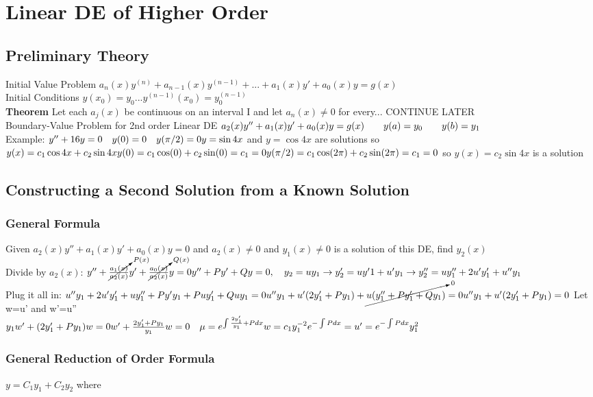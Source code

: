 \documentclass{article}
\begin{document}
\section{Linear DE of Higher Order}
\subsection{Preliminary Theory}
Initial Value Problem $a_n(x)y^{(n)}+a_{n-1}(x)y^{(n-1)}+...+a_1(x)y'+a_0(x)y=g(x)$
\\Initial Conditions $y(x_0)=y_0...y^{(n-1)}(x_0)=y_0^{(n-1)}$
\\\textbf{Theorem} Let each $a_j(x)$ be continuous on an interval I and let $a_n(x)\neq 0$ for every... CONTINUE LATER
\\Boundary-Value Problem for 2nd order Linear DE $a_2(x)y''+a_1(x)y'+a_0(x)y=g(x)\\  \qquad y(a)=y_0 \qquad y(b)=y_1$
\\Example: $y''+16y=0 \quad y(0)=0 \quad y(\pi/2) = 0
\\y=\sin 4x$ and $y=\cos 4x$ are solutions so $y(x)=c_1\cos 4x+ c_2 \sin 4x
\\y(0) = c_1\cos(0)+c_2\sin(0) =c_1= 0
\\y(\pi/2) = c_1\cos(2\pi)+c_2\sin(2\pi) =c_1= 0
$ so $y(x)=c_2\sin 4x$ is a solution

\subsection{Constructing a Second Solution from a Known Solution}

\subsubsection*{General Formula} Given $a_2(x)y''+a_1(x)y'+a_0(x)y=0$ and $a_2(x) \neq 0$ and $y_1(x) \neq 0$ is a solution of this DE, find $y_2(x)$
\\Divide by $a_2(x)$: $y''+\cancelto{P(x)}{\frac{a_1(x)}{a_2(x)}}y'+\cancelto{Q(x)}{\frac{a_0(x)}{a_2(x)}}y=0
\\y''+Py'+Qy=0, \quad y_2=uy_1 \rightarrow y_2'=uy'1+u'y_1 \rightarrow y_2''=uy_1''+2u'y_1'+u''y_1$ 
\\Plug it all in: $u''y_1+2u'y_1'+uy_1''+Py'y_1+Puy_1'+Quy_1=0
\\u''y_1+u'(2y_1'+Py_1)+\cancelto{0}{u(y_1''+Py_1'+Qy_1)}=0
\\u''y_1+u'(2y_1'+Py_1)=0$ Let w=u' and w'=u''
\\$y_1w'+(2y_1'+Py_1)w=0
\\ w'+\frac{2y_1'+Py_1}{y_1}w=0 \quad \mu = e^{\int \frac{2y_1'}{y_1}+P dx}
\\w=c_1y_1^{-2}e^{-\int P dx}=u' = {e^{-\int P dx}}{y_1^2}$
\\\subsubsection{General Reduction of Order Formula} $y=C_1y_1+C_2y_2$ where 
\end{document}
